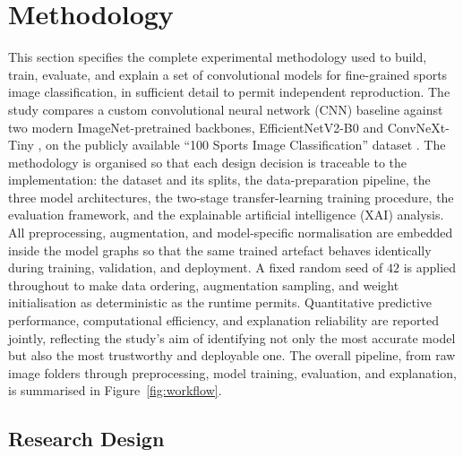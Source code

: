 \section{Methodology}
\label{sec:methodology}

This section specifies the complete experimental methodology used to build, train, evaluate, and explain a set of convolutional models for fine-grained sports image classification, in sufficient detail to permit independent reproduction.
The study compares a custom convolutional neural network (CNN) baseline against two modern ImageNet-pretrained backbones, EfficientNetV2-B0 \citep{tan2021efficientnetv2} and ConvNeXt-Tiny \citep{liu2022convnext}, on the publicly available ``100 Sports Image Classification'' dataset \citep{piosenka2022sports}.
The methodology is organised so that each design decision is traceable to the implementation: the dataset and its splits, the data-preparation pipeline, the three model architectures, the two-stage transfer-learning training procedure, the evaluation framework, and the explainable artificial intelligence (XAI) analysis.
All preprocessing, augmentation, and model-specific normalisation are embedded inside the model graphs so that the same trained artefact behaves identically during training, validation, and deployment.
A fixed random seed of $42$ is applied throughout to make data ordering, augmentation sampling, and weight initialisation as deterministic as the runtime permits.
Quantitative predictive performance, computational efficiency, and explanation reliability are reported jointly, reflecting the study's aim of identifying not only the most accurate model but also the most trustworthy and deployable one.
The overall pipeline, from raw image folders through preprocessing, model training, evaluation, and explanation, is summarised in Figure~\ref{fig:workflow}.

\subsection{Research Design}
\label{subsec:method-design}

